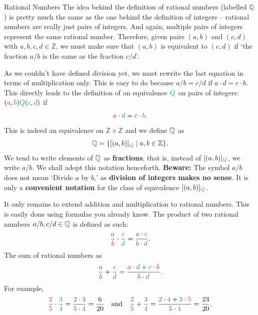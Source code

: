 \documentclass[final]{beamer}
\newlength{\colwidth}
\newcommand{\Z}{\mathbb{Z}}
\newcommand{\Q}{\mathbb{Q}}
\newcommand{\clr}{\textcolor{BrickRed}}
\newcommand{\clb}{\textcolor{RoyalBlue}}
\newcommand{\clg}{\textcolor{ForestGreen}}
\newcommand{\clm}{\textcolor{Fuchsia}}
\begin{document}
\begin{frame}[t]
\begin{columns}[t]
\begin{column}{\colwidth}
\begin{exampleblock}{Rational Numbers}
 The idea behind the definition of rational numbers (labelled $\Q$) is pretty
 much the same as the one behind the definition of integers -- rational numbers
 are really just \alert{pairs of integers}. And again, multiple pairs of
 integers \alert{represent the same} rational number. Therefore, given pairs
 $(a,b)$ and $(c,d)$ with $a,b,c,d \in \Z$, we must make sure that $(a,b)$
 \alert{is equivalent to} $(c,d)$ if `\alert{the fraction $a / b$ is the same as
 the fraction $c / d$}'.

 As we couldn't have defined division yet, we must \alert{rewrite the last
 equation in terms of multiplication only}. This is easy to do because $a / b =
 c / d$ if $a \cdot d = c \cdot b$. This directly leads to the definition of an
 \alert{equivalence} $\clg{Q}$ on pairs of integers: $(\clr{a},
 \clr{b})\clg{Q}(\clb{c},\clb{d})$ if
 \[
  \clr{a} \cdot \clb{d} = \clr{c} \cdot \clb{b}.
 \]
 This is indeed an equivalence on $\Z \times \Z$ and we define $\clm{\Q}$ as
 \[
  \clm{\Q} = \{[(a,b)]_{\clg{Q}} \mid a,b \in \Z\}.
 \]
 We tend to write elements of $\clm{\Q}$ as \textbf{fractions}, that is, instead
 of $[(a,b)]_{\clg{Q}}$, we write $a / b$. We shall adopt this notation
 henceforth. \alert{\textbf{Beware:}} The symbol $a / b$ \alert{does not mean}
 `Divide $a$ by $b$,' as \textbf{division of integers makes no sense}. It is
 only a \textbf{convenient notation} for the class of equivalence
 $[(a,b)]_{\clg{Q}}$.

 It only remains to \alert{extend addition and multiplication} to rational
 numbers. This is easily done using formulae you already know. The
 \alert{product} of two rational numbers $a / b, c / d \in \clm{\Q}$ is defined
 as such:
 \[
  \frac{\clr{a}}{\clr{b}} \cdot \frac{\clb{c}}{\clb{d}} = \frac{\clr{a} \cdot
  \clb{c}}{\clr{b} \cdot \clb{d}}.
 \]
 The \alert{sum} of rational numbers as
 \[
  \frac{\clr{a}}{\clr{b}} + \frac{\clb{c}}{\clb{d}} = \frac{\clr{a} \cdot
  \clb{d} + \clb{c} \cdot \clr{b}}{\clr{b} \cdot \clb{d}}.
 \]
 For example,
 \[
  \frac{\clr{2}}{\clr{5}} \cdot \frac{\clb{3}}{\clb{4}} = \frac{\clr{2} \cdot
  \clb{3}}{\clr{5} \cdot \clb{4}} = \frac{6}{20} \quad \text{and} \quad
  \frac{\clr{2}}{\clr{5}} + \frac{\clb{3}}{\clb{4}} = \frac{\clr{2} \cdot
  \clb{4} + \clb{3} \cdot \clr{5}}{\clr{5} \cdot \clb{4}} = \frac{23}{20}.
 \]
 

\end{exampleblock}
\end{column}
\end{columns}
\end{frame}
\end{document}
